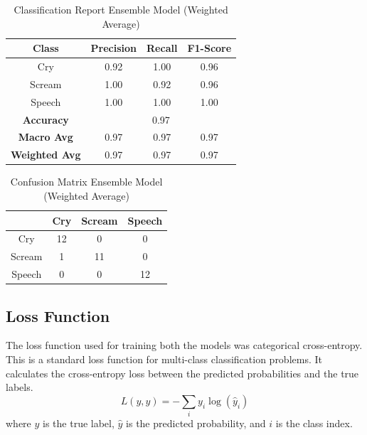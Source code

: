 \documentclass[conference]{IEEEtran}
\begin{document}
\begin{table}[htbp]
\caption{Classification Report Ensemble Model (Weighted Average)}
\begin{center}
\begin{tabular}{|c|c|c|c|}
\hline
\textbf{Class} & \textbf{Precision} & \textbf{Recall} & \textbf{F1-Score} \\
\hline
Cry & 0.92 & 1.00 & 0.96 \\
\hline
Scream & 1.00 & 0.92 & 0.96 \\
\hline
Speech & 1.00 & 1.00 & 1.00 \\
\hline
\textbf{Accuracy} & \multicolumn{3}{|c|}{0.97} \\
\hline
\textbf{Macro Avg} & 0.97 & 0.97 & 0.97 \\
\hline
\textbf{Weighted Avg} & 0.97 & 0.97 & 0.97 \\
\hline
\end{tabular}
\label{tab:classification_report_weighted_average}
\end{center}
\end{table}

\begin{table}[htbp]
\caption{Confusion Matrix Ensemble Model (Weighted Average)}
\begin{center}
\begin{tabular}{|c|c|c|c|}
\hline
& \textbf{Cry} & \textbf{Scream} & \textbf{Speech} \\
\hline
Cry & 12 & 0 & 0 \\
\hline
Scream & 1 & 11 & 0 \\
\hline
Speech & 0 & 0 & 12 \\
\hline
\end{tabular}
\label{tab:confusion_matrix_weighted_average}
\end{center}
\end{table}

\subsection{Loss Function}
The loss function used for training both the models was categorical cross-entropy. This is a standard loss function for multi-class classification problems. It calculates the cross-entropy loss between the predicted probabilities and the true labels.
\begin{equation}
    L(y, \hat{y}) = -\sum_{i} y_i \log(\hat{y}_i)
\end{equation}
where $y$ is the true label, $\hat{y}$ is the predicted probability, and $i$ is the class index. 
\end{document}
